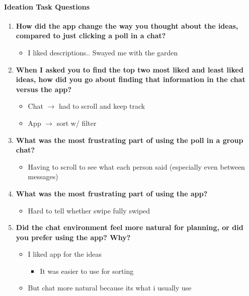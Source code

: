 \documentclass[12pt,a4paper]{article}
\begin{document}
\paragraph{Ideation Task Questions}

\begin{enumerate}
    \item \textbf{How did the app change the way you thought about the ideas, compared to just clicking a poll in a chat?}
    \begin{itemize}
        \item I liked descriptions.. Swayed me with the garden
    \end{itemize}

    \item \textbf{When I asked you to find the top two most liked and least liked ideas, how did you go about finding that information in the chat versus the app?}
    \begin{itemize}
        \item Chat $\rightarrow$ had to scroll and keep track
        \item App $\rightarrow$ sort w/ filter
    \end{itemize}

    \item \textbf{What was the most frustrating part of using the poll in a group chat?}
    \begin{itemize}
        \item Having to scroll to see what each person said (especially even between messages)
    \end{itemize}

    \item \textbf{What was the most frustrating part of using the app?}
    \begin{itemize}
        \item Hard to tell whether swipe fully swiped
    \end{itemize}

    \item \textbf{Did the chat environment feel more natural for planning, or did you prefer using the app? Why?}
    \begin{itemize}
        \item I liked app for the ideas
        \begin{itemize}
            \item It was easier to use for sorting
        \end{itemize}
        \item But chat more natural because its what i usually use
    \end{itemize}
\end{enumerate}
\end{document}

